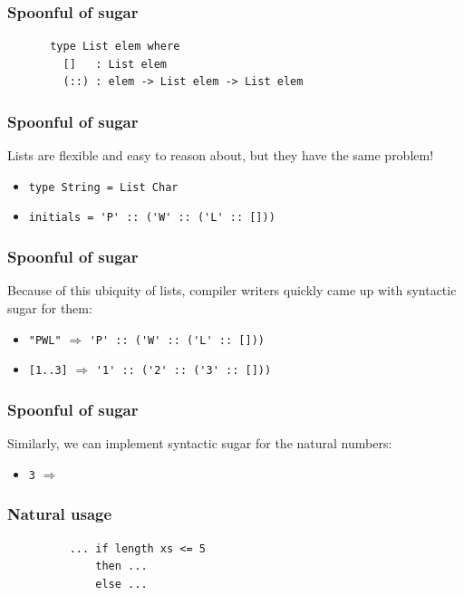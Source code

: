 \documentclass{beamer}
\begin{document}
  \begin{frame}[fragile]
    \frametitle{Spoonful of sugar}
    \begin{figure}
    {\color{dark-gray}
      \centering
\begin{BVerbatim}
 type List elem where
   []   : List elem
   (::) : elem -> List elem -> List elem
\end{BVerbatim}
    }
    \end{figure}
  \end{frame}
  \begin{frame}[fragile]
    \frametitle{Spoonful of sugar}
    Lists are flexible and easy to reason about, but they have the same problem!
    \begin{itemize}
      \item<2 -> {\color{dark-gray} \verb-type String = List Char-}
      \item<3  > {\color{dark-gray} \verb-initials = 'P' :: ('W' :: ('L' :: []))-}
    \end{itemize}
  \end{frame}
  \begin{frame}[fragile]
    \frametitle{Spoonful of sugar}
    Because of this ubiquity of lists, compiler writers quickly came up with syntactic sugar for them:
    \begin{itemize}
      \item<2 -> {\color{dark-gray} \verb-"PWL"- $\Rightarrow$ \verb-'P' :: ('W' :: ('L' :: []))-}
      \item<3  > {\color{dark-gray} \verb-[1..3]- $\Rightarrow$ \verb-'1' :: ('2' :: ('3' :: []))-}
    \end{itemize}
  \end{frame}
  \begin{frame}[fragile]
    \frametitle{Spoonful of sugar}
    Similarly, we can implement syntactic sugar for the natural numbers:
    \begin{itemize}
      \item<2 -> {\color{dark-gray} \verb-3- $\Rightarrow$ }
    \end{itemize}
  \end{frame}
  \begin{frame}[fragile]
    \frametitle{Natural usage}
    \begin{figure}
    {\color{dark-gray}
      \centering
\begin{BVerbatim}
    ... if length xs <= 5
        then ...
        else ...
\end{BVerbatim}
    }
    \end{figure}
  \end{frame}
\end{document}
